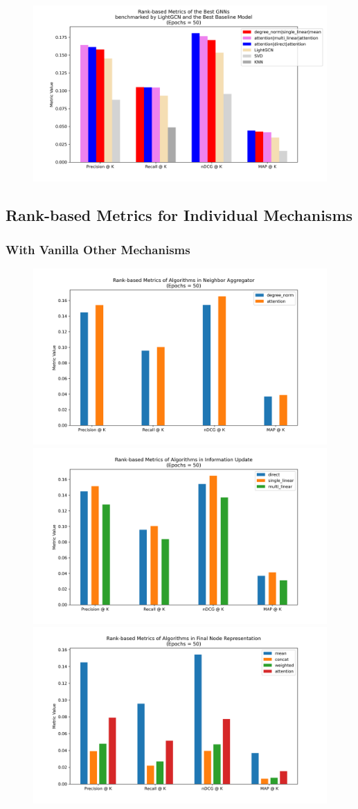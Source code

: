 \documentclass{article}
\begin{document}
\begin{figure}[H]
    \centering
    \includegraphics[width=.8\textwidth]{figs/best_models_and_baselines.png}
    \caption{}
    \label{fig:metrics-overall}
\end{figure}


\subsection{Rank-based Metrics for Individual Mechanisms}

\subsubsection{With Vanilla Other Mechanisms}

\begin{figure}[H]
    \centering
    \includegraphics[width=.48\textwidth]{figs/neighbor_aggregator.png}
    \includegraphics[width=.48\textwidth]{figs/info_updater.png}
    \includegraphics[width=.48\textwidth]{figs/final_node_repr.png}
    \caption{}
    \label{fig:metrics-individual-mechanisms}
\end{figure}
\end{document}
